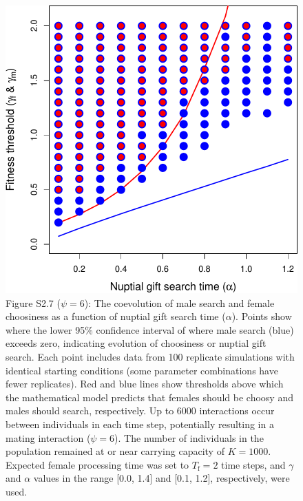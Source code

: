 \documentclass[
]{article}
\begin{document}
\captionsetup{labelformat=default}

\clearpage

\captionsetup{labelformat=empty}

\begin{figure}
\centering
\includegraphics{ms_biorxiv_files/figure-latex/unnamed-chunk-12-1.pdf}
\caption{Figure S2.7 (\(\psi = 6\)): The coevolution of male search and
female choosiness as a function of nuptial gift search time
(\(\alpha\)). Points show where the lower 95\% confidence interval of
where male search (blue) exceeds zero, indicating evolution of
choosiness or nuptial gift search. Each point includes data from 100
replicate simulations with identical starting conditions (some parameter
combinations have fewer replicates). Red and blue lines show thresholds
above which the mathematical model predicts that females should be
choosy and males should search, respectively. Up to 6000 interactions
occur between individuals in each time step, potentially resulting in a
mating interaction (\(\psi = 6\)). The number of individuals in the
population remained at or near carrying capacity of \(K = 1000\).
Expected female processing time was set to \(T_{\mathrm{f}}=2\) time
steps, and \(\gamma\) and \(\alpha\) values in the range {[}0.0, 1.4{]}
and {[}0.1, 1.2{]}, respectively, were used.}
\end{figure}
\end{document}
